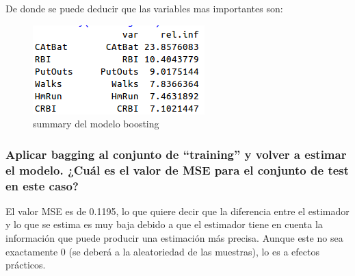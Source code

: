 De donde se puede deducir que las variables mas importantes son:

\begin{figure}[H]
\centering
\includegraphics[scale=0.60]{ej4-42.png}
\caption{summary del modelo boosting}
\label{}
\end{figure}

\subsubsection{Aplicar bagging al conjunto de ``training'' y volver a estimar el modelo. ¿Cuál es el valor de MSE para el conjunto de test en este caso?}

El valor MSE es de  0.1195, lo que quiere decir que la diferencia entre el estimador y lo que se estima es muy baja debido a que el estimador tiene en cuenta la información que puede producir una estimación más precisa. Aunque este no sea exactamente 0 (se deberá a la aleatoriedad de las muestras), lo es a efectos prácticos.







